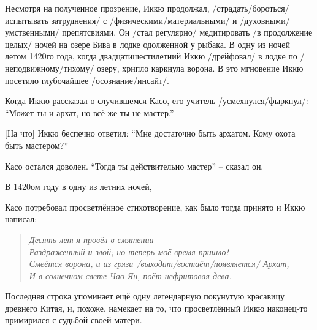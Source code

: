 \begin{ver}
Несмотря на полученное прозрение, Иккю продолжал,
/страдать/бороться/испытывать затруднения/ с
/физическими/материальными/ и /духовными/умственными/ препятсвиями.
Он /стал регулярно/ медитировать /в
продолжение целых/ ночей на озере Бива в лодке
одолженной у рыбака. В одну из ночей летом 1420го года, когда
двадцатишестилетний Иккю /дрейфовал/ в лодке по /неподвижному/тихому/ 
озеру, хрипло каркнула ворона. В это мгновение Иккю посетило
глубочайшее /осознание/инсайт/.

Когда Иккю рассказал о случившемся Касо, его учитель
/усмехнулся/фыркнул/: ``Может ты и архат, но всё же ты не мастер.''

[На что] Иккю беспечно ответил: ``Мне достаточно быть архатом. Кому
охота быть мастером?''

Касо остался доволен. ``Тогда ты действительно мастер'' -- сказал он. 
\end{ver}

\begin{ver}[1]
В 1420ом году в одну из летних ночей, 
\end{ver}

\begin{ver}
  Касо потребовал просветлённое стихотворение, как было тогда принято
  и Иккю написал:
\end{ver}

\begin{ver}
  \begin{verse}\it
    Десять лет я провёл в смятении\\
    Раздраженный и злой; но теперь моё время пришло!\\
    Смеётся ворона, и из грязи /выходит/востаёт/появляется/ Архат,\\
    И в солнечном свете Чао-Ян, поёт нефритовая дева.
  \end{verse}
\end{ver}

\begin{ver}
  Последняя строка упоминает ещё одну легендарную покунутую красавицу
  древнего Китая, и, похоже, намекает на то, что просветлённый Иккю
  наконец-то примирился с судьбой своей матери.
\end{ver}

